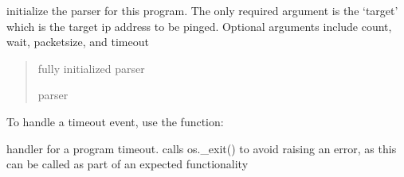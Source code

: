 \documentclass[letterpaper,10pt,english,openany,oneside]{sphinxmanual}
\begin{document}
\begin{fulllineitems}
\label{\detokenize{index:my_ping.initialize_parser}}
\pysigstartsignatures
\pysiglinewithargsret
{}
{}
{}
\pysigstopsignatures
\sphinxAtStartPar
initialize the parser for this program. The only required argument is the ‘target’ which is the target ip address
to be pinged. Optional arguments include count, wait, packetsize, and timeout
\begin{quote}\begin{description}
\sphinxAtStartPar
fully initialized parser

\sphinxAtStartPar
parser

\end{description}\end{quote}

\end{fulllineitems}


\sphinxAtStartPar
To handle a timeout event, use the  function:

\begin{fulllineitems}
\label{\detokenize{index:my_ping.timeout_handler}}
\pysigstartsignatures
\pysiglinewithargsret
{}
{\sphinxparamcomma {}}
{}
\pysigstopsignatures
\sphinxAtStartPar
handler for a program timeout. calls os.\_exit() to avoid raising an error, as this
can be called as part of an expected functionality

\end{fulllineitems}




\renewcommand{\indexname}{Index}
\printindex
\end{document}
